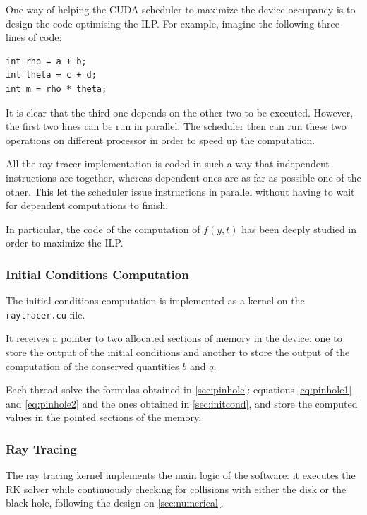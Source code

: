 One way of helping the \ac{CUDA} scheduler to maximize the device occupancy is to design the code optimising the \ac{ILP}. For example, imagine the following three lines of code:

\begin{lstlisting}
int rho = a + b;
int theta = c + d;
int m = rho * theta;
\end{lstlisting}

It is clear that the third one depends on the other two to be executed. However, the first two lines can be run in parallel. The scheduler then can run these two operations on different processor in order to speed up the computation.

All the ray tracer implementation is coded in such a way that independent instructions are together, whereas dependent ones are as far as possible one of the other. This let the scheduler issue instructions in parallel without having to wait for dependent computations to finish.

In particular, the code of the computation of $f(y,t)$ has been deeply studied in order to maximize the \ac{ILP}.

\subsubsection*{Initial Conditions Computation}

The initial conditions computation is implemented as a kernel on the \lstinline{raytracer.cu} file.

It receives a pointer to two allocated sections of memory in the device: one to store the output of the initial conditions and another to store the output of the computation of the conserved quantities $b$ and $q$.

Each thread solve the formulas obtained in \autoref{sec:pinhole}: equations \ref{eq:pinhole1} and \ref{eq:pinhole2} and the ones obtained in \autoref{sec:initcond}, and store the computed values in the pointed sections of the memory.

\subsubsection*{Ray Tracing}

The ray tracing kernel implements the main logic of the software: it executes the \ac{RK} solver while continuously checking for collisions with either the disk or the black hole, following the design on \autoref{sec:numerical}.

